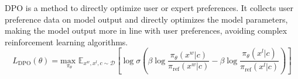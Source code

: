 DPO is a method to directly optimize user or expert preferences. It collects user preference data on model output and directly optimizes the model parameters, making the model output more in line with user preferences, avoiding complex reinforcement learning algorithms.
\begin{equation}
    L_{\text{DPO}}(\theta)\!=\underset{\pi_{\theta}}{\text{max }}\mathbb{E}_{x^w,x^l,c \sim \mathcal{D}}[\log \sigma(\beta \log \frac{\pi_\theta(x^w|c)}{\pi_{\text{ref}}(x^w|c)}-\beta \log \frac{\pi_\theta(x^l|c)}{\pi_{\text{ref}}(x^l|c)})]
    \label{eq:dpo}
\end{equation}

